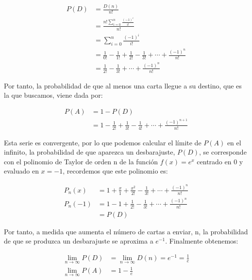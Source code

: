 \documentclass[12pt,spanish]{article}
\theoremstyle{definition}
\theoremstyle{remark}
\begin{document}
\begin{align*}
  P(D)&=\frac{D(n)}{n!}\\
  &=\frac{n!\sum\limits_{i=0}^n\frac{(-1)^i}{i!}}{n!}\\
  &=\sum\limits_{i=0}^n\frac{(-1)^i}{i!}\\
  &=\frac{1}{0!}-\frac{1}{1!}+\frac{1}{2!}-\frac{1}{3!}+\cdots+\frac{(-1)^n}{n!}\\
  &=\frac{1}{2!}-\frac{1}{3!}+\cdots+\frac{(-1)^n}{n!}
\end{align*}

\begin{justify}
  Por tanto, la probabilidad de que al menos una carta llegue a su
  destino, que es la que buscamos, viene dada por:
\end{justify}

\begin{align*}
  P(A)&=1-P(D)\\
  &=1-\frac{1}{2!}+\frac{1}{3!}-\frac{1}{4!}+\cdots+\frac{(-1)^{n+1}}{n!}
\end{align*}

\begin{justify}
  Esta serie es convergente, por lo que podemos calcular el límite de
  $P(A)$ en el infinito, la probabilidad de que aparezca un
  desbarajuste, $P(D)$, se corresponde con el polinomio de Taylor de
  orden n de la función $f(x)=e^x$ centrado en $0$ y evaluado en
  $x=-1$, recordemos que este polinomio es:
\end{justify}

\begin{align*}
  P_n(x)&=1+\frac{x}{1}+\frac{x^2}{2!}-\frac{1}{3!}+\cdots+\frac{(-1)^n}{n!}\\
  P_n(-1)&=1-1+\frac{1}{2!}-\frac{1}{3!}+\cdots+\frac{(-1)^n}{n!}\\
  &=P(D)
\end{align*}

\begin{justify}
  Por tanto, a medida que aumenta el número de cartas a enviar, n, la probabilidad de que se produzca un desbarajuste se aproxima a $e^{-1}$. Finalmente obtenemos:
\end{justify}

\begin{align*}
  \lim_{n\to\infty} P(D)&=\lim_{n\to\infty} D(n)=e^{-1}=\frac{1}{e}\\
  \lim_{n\to\infty} P(A)&=1-\frac{1}{e} 
\end{align*}
\end{document}
